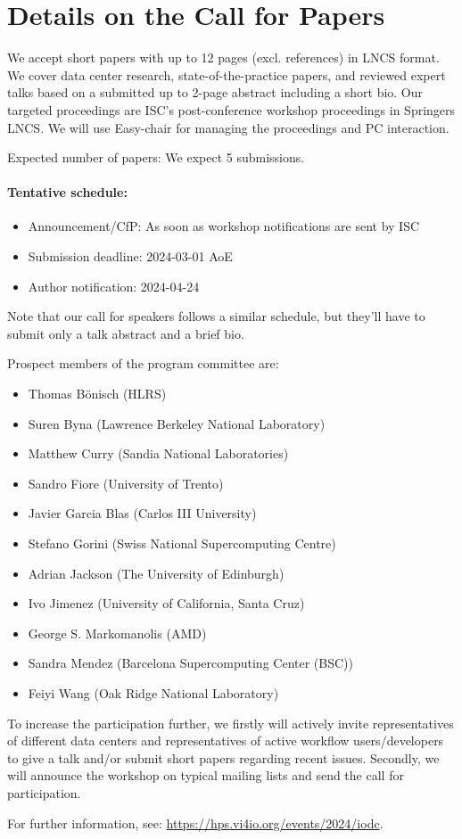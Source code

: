 \documentclass[a4paper,10pt]{article}
\begin{document}
\section{Details on the Call for Papers}

We accept short papers with up to 12 pages (excl. references) in LNCS format.
We cover data center research, state-of-the-practice papers, and reviewed expert talks based on a submitted up to 2-page abstract including a short bio.
Our targeted proceedings are ISC's post-conference workshop proceedings in Springers LNCS.
We will use Easy-chair for managing the proceedings and PC interaction.

Expected number of papers: We expect 5 submissions.

\paragraph{Tentative schedule:}
\begin{itemize}
  \item Announcement/CfP: As soon as workshop notifications are sent by ISC
  \item Submission deadline: 2024-03-01 AoE
  \item Author notification: 2024-04-24
\end{itemize}
Note that our call for speakers follows a similar schedule, but they'll have to submit only a talk abstract and a brief bio.

Prospect members of the program committee are:
\begin{itemize}
  \item Thomas Bönisch (HLRS)
  \item Suren Byna (Lawrence Berkeley National Laboratory) 
  \item Matthew Curry (Sandia National Laboratories)  
  \item Sandro Fiore (University of Trento)  
  \item Javier Garcia Blas (Carlos III University) 
  \item Stefano Gorini (Swiss National Supercomputing Centre) 
  \item Adrian Jackson (The University of Edinburgh) 
  \item Ivo Jimenez (University of California, Santa Cruz)
  \item George S. Markomanolis (AMD) 
  \item Sandra Mendez (Barcelona Supercomputing Center (BSC)) 
  \item Feiyi Wang (Oak Ridge National Laboratory) 
\end{itemize}

To increase the participation further, we firstly will actively invite representatives of different data centers and representatives of active workflow users/developers to give a talk and/or submit short papers regarding recent issues.
Secondly, we will announce the workshop on typical mailing lists and send the call for participation.


For further information, see:
\url{https://hps.vi4io.org/events/2024/iodc}.
\end{document}
